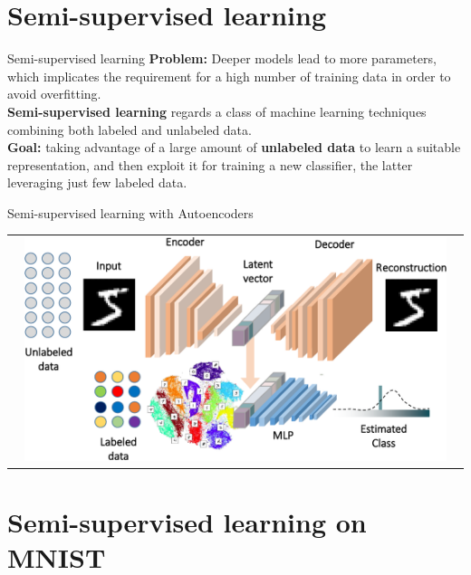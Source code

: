 \documentclass[aspectratio=169]{beamer}
\begin{document}

\section{Semi-supervised learning}

\begin{frame}{Semi-supervised learning}
\textbf{Problem:} Deeper models lead to more parameters, which implicates the requirement for a high number of training data in order to avoid overfitting.\\
\vspace{0.4cm}
\textbf{Semi-supervised learning} regards a class of machine learning techniques combining both labeled and unlabeled data.\\
\vspace{0.4cm}
\textbf{Goal:} taking advantage of a large amount of \textbf{unlabeled data} to learn a suitable representation, and then exploit it for training a new classifier, the latter leveraging just few labeled data. 
\end{frame}
\begin{frame}{Semi-supervised learning with Autoencoders}
\begin{tabular}{c}
	\includegraphics[width=0.95\textwidth]{img/autoencoder/semi.pdf}
\end{tabular}
\end{frame}


\section{Semi-supervised learning on MNIST}
\end{document}

